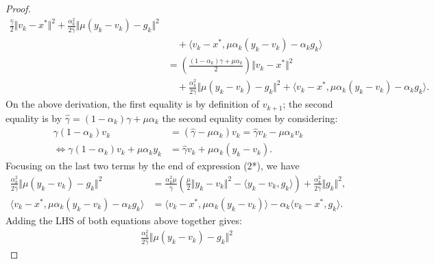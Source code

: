 \documentclass[12pt]{article}
\begin{document}
\begin{proof}
\begin{align*}
            \frac{\hat \gamma}{2}
            \Vert v_k - x^*\Vert^2 
            + 
            \frac{\alpha_k^2}{2\hat \gamma}\Vert \mu(y_k - v_k) - g_k\Vert^2 
            \\ &\quad 
                + 
                \langle v_k - x^*, \mu \alpha_k(y_k - v_k) - \alpha_k g_k\rangle
            \\
            &= 
            \left(
            \frac{(1 - \alpha_k)\gamma + \mu \alpha_k}{2} 
            \right)\Vert v_k - x^*\Vert^2
            \\ &\quad
                + 
                \frac{\alpha_k^2}{2\hat \gamma}
                \Vert \mu(y_k - v_k) - g_k\Vert^2 
                + 
                \langle v_k - x^*, \mu \alpha_k(y_k - v_k) - \alpha_k g_k\rangle. 
        \tag{2*}
        \end{align*}
        On the above derivation, the first equality is by definition of $v_{k + 1}$; the second equality is by $\hat \gamma = (1 - \alpha_k)\gamma + \mu \alpha_k$ the second equality comes by considering: 
        \begin{align*}
            \gamma(1 - \alpha_k) v_k &= 
            (\hat \gamma  - \mu \alpha_k)v_k
            = \hat \gamma v_k - \mu\alpha_k v_k
            \\
            \iff 
            \gamma(1 - \alpha_k) v_k + \mu \alpha_k y_k
            &= 
            \hat \gamma v_k + \mu \alpha_k(y_k - v_k). 
        \end{align*}
        Focusing on the last two terms by the end of expression (2*), we have  
        \begin{align*}
            \frac{\alpha^2_k}{2\hat \gamma} 
            \Vert \mu(y_k - v_k) - g_k\Vert^2
            & = 
            \frac{\alpha_k^2\mu}{\hat \gamma}
            \left(
                \frac{\mu}{2}\Vert y_k - v_k\Vert^2 
                - \langle y_k - v_k, g_k\rangle
            \right)
            + \frac{\alpha_k^2}{2\hat \gamma}\Vert g_k\Vert^2, 
            \\
            \langle v_k - x^*, \mu \alpha_k(y_k - v_k) - \alpha_k g_k\rangle
            &= 
            \langle v_k - x^*, \mu\alpha_k(y_k - v_k)\rangle 
            - \alpha_k \langle v_k - x^*, g_k\rangle. 
        \tag{2.1*}
        \end{align*}
        Adding the LHS of both equations above together gives: 
        {\small
        \begin{align*}
            & \quad 
            \frac{\alpha^2_k}{2\hat \gamma} 
            \Vert \mu(y_k - v_k) - g_k\Vert^2

\end{align*}}
\end{proof}
\end{document}
